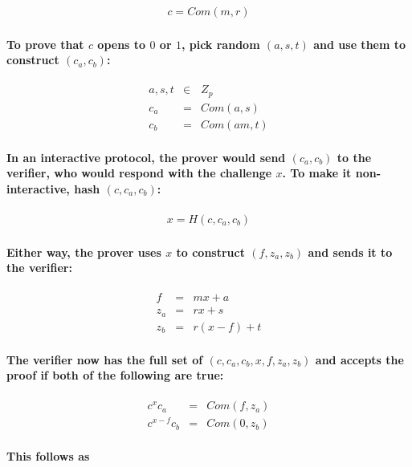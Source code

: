 \documentclass{article}
\begin{document}
\begin{eqnarray}
  c=Com(m, r)
\end{eqnarray}

\paragraph{To prove that $c$ opens to $0$ or $1$, pick random $(a,s,t)$ and use them to construct $(c_a, c_b)$:}

\begin{eqnarray}
  a,s,t &\in& Z_p\\
  c_a &=& Com(a, s)\\
  c_b &=& Com(am, t)
\end{eqnarray}

\paragraph{In an interactive protocol, the prover would send $(c_a,c_b)$ to the verifier, who would respond with the challenge $x$.  To make it non-interactive, hash $(c, c_a, c_b)$:}

\begin{eqnarray}
  x = H(c, c_a, c_b)
\end{eqnarray}

\paragraph{Either way, the prover uses $x$ to construct $(f, z_a, z_b)$ and sends it to the verifier:}
 
\begin{eqnarray}
  f &=& mx + a\\
  z_a &=& rx + s\\
  z_b &=& r(x-f) + t
\end{eqnarray}

\paragraph{The verifier now has the full set of $(c, c_a, c_b, x, f, z_a, z_b)$ and accepts the proof if both of the following are true:}

\begin{eqnarray}
  c^x c_a &=& Com(f, z_a)\\
  c^{x-f} c_b &=& Com(0, z_b)
\end{eqnarray}

\paragraph{This follows as }
\end{document}
